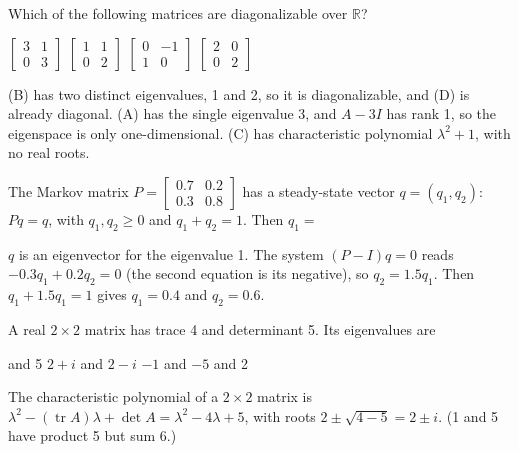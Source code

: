 \begin{question}[id=eig-17, type=msq, marks=2]
Which of the following matrices are diagonalizable over $\mathbb{R}$?
\begin{options}
  \option $\begin{bmatrix} 3 & 1 \\ 0 & 3 \end{bmatrix}$
  \correct $\begin{bmatrix} 1 & 1 \\ 0 & 2 \end{bmatrix}$
  \option $\begin{bmatrix} 0 & -1 \\ 1 & 0 \end{bmatrix}$
  \correct $\begin{bmatrix} 2 & 0 \\ 0 & 2 \end{bmatrix}$
\end{options}
\begin{solution}
(B) has two distinct eigenvalues, 1 and 2, so it is diagonalizable, and (D) is already diagonal. (A) has the single eigenvalue 3, and $A - 3I$ has rank 1, so the eigenspace is only one-dimensional. (C) has characteristic polynomial $\lambda^2 + 1$, with no real roots.
\end{solution}
\end{question}

\begin{question}[id=eig-18, marks=2]
The Markov matrix $P = \begin{bmatrix} 0.7 & 0.2 \\ 0.3 & 0.8 \end{bmatrix}$ has a steady-state vector $q = (q_1, q_2)$: $Pq = q$, with $q_1, q_2 \ge 0$ and $q_1 + q_2 = 1$. Then $q_1 =$
\begin{solution}
$q$ is an eigenvector for the eigenvalue 1. The system $(P - I)q = 0$ reads $-0.3q_1 + 0.2q_2 = 0$ (the second equation is its negative), so $q_2 = 1.5q_1$. Then $q_1 + 1.5q_1 = 1$ gives $q_1 = 0.4$ and $q_2 = 0.6$.
\end{solution}
\end{question}

\begin{question}[id=eig-19]
A real $2 \times 2$ matrix has trace 4 and determinant 5. Its eigenvalues are
\begin{options}
   and 5
  \correct $2 + i$ and $2 - i$
  \option $-1$ and $-5$
   and 2
\end{options}
\begin{solution}
The characteristic polynomial of a $2 \times 2$ matrix is $\lambda^2 - (\operatorname{tr} A)\lambda + \det A = \lambda^2 - 4\lambda + 5$, with roots $2 \pm \sqrt{4 - 5} = 2 \pm i$. (1 and 5 have product 5 but sum 6.)
\end{solution}
\end{question}

